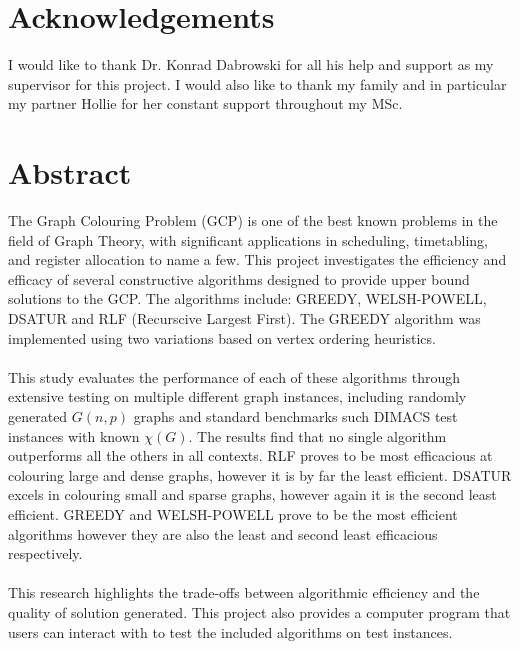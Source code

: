 \documentclass[11pt]{report}
\renewcommand\thesection{\arabic{section}}
\begin{document}
\section*{Acknowledgements}
I would like to thank Dr. Konrad Dabrowski for all his help and support as my supervisor for this project. I would also like to thank my family and in particular my partner Hollie for her constant support throughout my MSc.
\newpage
\section*{Abstract}
The Graph Colouring Problem (GCP) is one of the best known problems in the field of Graph Theory, with significant applications in scheduling, timetabling, and register allocation to name a few. This project investigates the efficiency and efficacy of several constructive algorithms designed to provide upper bound solutions to the GCP. The algorithms include: GREEDY, WELSH-POWELL, DSATUR and RLF (Recurscive Largest First). The GREEDY algorithm was implemented using two variations based on vertex ordering heuristics. 
\\\\
This study evaluates the performance of each of these algorithms through extensive testing on multiple different graph instances, including randomly generated $G(n, p)$ graphs and standard benchmarks such DIMACS test instances with known $\chi(G)$. The results find that no single algorithm outperforms all the others in all contexts. RLF proves to be most efficacious at colouring large and dense graphs, however it is by far the least efficient. DSATUR excels in colouring small and sparse graphs, however again it is the second least efficient. GREEDY and WELSH-POWELL prove to be the most efficient algorithms however they are also the least and second least efficacious respectively. 
\\\\
This research highlights the trade-offs between algorithmic efficiency and the quality of solution generated. This project also provides a computer program that users can interact with to test the included algorithms on test instances.

\tableofcontents
\listoffigures
\listoftables
\clearpage











\printbibliography


\renewcommand\thesection{\Alph{section}}
\appendix

\end{document}
